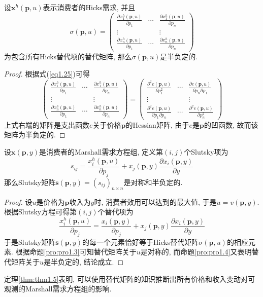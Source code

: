 \documentclass[cn, 12pt, math=mtpro2, bibstyle=apa, blue]{elegantbook}
\newcommand{\p}{\mathbf{p}}
\newcommand{\x}{\mathbf{x}}
\begin{document}
\begin{proposition}\label{pro:pro1.4}
设$\x^h(\p,u)$表示消费者的Hicks需求, 并且
$$\sigma(\p,u)=\begin{pmatrix}
                 \frac{\partial x_1^h(\p,u)}{\partial p_1} & \cdots & \frac{\partial x_1^h(\p,u)}{\partial p_n} \\
                 \vdots &  & \vdots \\
                 \frac{\partial x_n^h(\p,u)}{\partial p_1} & \cdots & \frac{\partial x_n^h(\p,u)}{\partial p_n}
               \end{pmatrix}$$
为包含所有Hicks替代项的替代矩阵, 那么$\sigma(\p,u)$是半负定的.
\end{proposition}
\begin{proof}
  根据式(\ref{eq1.25})可得
  $$\begin{pmatrix}
                 \frac{\partial x_1^h(\p,u)}{\partial p_1} & \cdots & \frac{\partial x_1^h(\p,u)}{\partial p_n} \\
                 \vdots &  & \vdots \\
                 \frac{\partial x_n^h(\p,u)}{\partial p_1} & \cdots & \frac{\partial x_n^h(\p,u)}{\partial p_n}
               \end{pmatrix}=\begin{pmatrix}
                               \frac{\partial^2 e(\p,u)}{\partial p_1^2} & \cdots & \frac{\partial e(\p,u)}{\partial p_n\partial p_1} \\
                               \vdots &  & \vdots \\
                               \frac{\partial^2 e(\p,u)}{\partial p_1\partial p_n} & \cdots & \frac{\partial^2 e(\p,u)}{\partial p_n^2}
                             \end{pmatrix}$$
  上式右端的矩阵是支出函数$e$关于价格$\p$的Hessian矩阵, 由于$e$是$\p$的凹函数, 故而该矩阵为半负定的.
\end{proof}
\begin{theorem}\label{thm:thm1.5}
  设$\x(\p,y)$是消费者的Marshall需求方程组, 定义第$(i,j)$个Slutsky项为
  $$s_{ij}=\frac{x_i^h(\p,u)}{\partial p_j}+x_j(\p,y)\frac{\partial x_i(\p,y)}{\partial y}$$
  那么Slutsky矩阵$\mathbf{s}(\p,y)=(s_{ij})_{n\times n}$是对称和半负定的.
\end{theorem}
\begin{proof}
  设$u$是价格为$\p$收入为$y$时, 消费者效用可以达到的最大值, 于是$u=v(\p,y)$. 根据Slutsky方程可得第$(i,j)$个替代项为
  $$\frac{x_i^h(\p,u)}{\partial p_j}=\frac{x_i(\p,y)}{\partial p_j}+x_j(\p,y)\frac{\partial x_i(\p,y)}{\partial y}$$
  于是Slutsky矩阵$\mathbf{s}(\p,y)$的每一个元素恰好等于Hicks替代矩阵$\sigma(\p,u)$的相应元素. 根据命题\ref{pro:pro1.3}可知替代矩阵关于$u$是对称的, 而命题\ref{pro:pro1.4}又表明替代矩阵关于$u$是半负定的, 结论成立.
\end{proof}
定理\ref{thm:thm1.5}表明, 可以使用替代矩阵的知识推断出所有价格和收入变动对可观测的Marshall需求方程组的影响.
\end{document}
